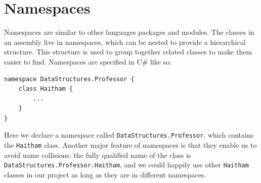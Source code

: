 \documentclass[12pt,a4paper,final,twoside,titlepage]{book}
\begin{document}
\section{Namespaces}
Namespaces are similar to other languages packages and modules. The classes in an assembly live in namespaces, which can be nested to provide a hierarchical structure. This structure is used to group together related classes to make them easier to find. Namespaces are specified in C\# like so:
\lstset{language=csh, tabsize=4}
\begin{lstlisting}
namespace DataStructures.Professor { 
	class Haitham { 
		... 
	}
}
\end{lstlisting}
Here we declare a namespace called \texttt{DataStructures.Professor}, which contains the \texttt{Haitham} class. Another major feature of namespaces is that they enable us to avoid name collisions: the fully qualified name of the class is \texttt{DataStructures.Professor.Haitham}, and we could happily use other \texttt{Haitham} classes in our project as long as they are in different namespaces.
\end{document}
